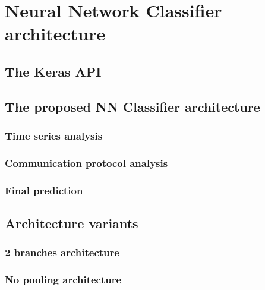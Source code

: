 \chapter{Neural Network Classifier architecture}

\lipsum[1]

\section{The Keras API}
\lipsum[1]

\section{The proposed NN Classifier architecture}
\lipsum[1]
\subsection{Time series analysis}
\lipsum[1]
\subsection{Communication protocol analysis}
\lipsum[1]
\subsection{Final prediction}
\lipsum[1]

\section{Architecture variants}
\lipsum[1]


\subsection{2 branches architecture}
\lipsum[1]
\subsection{No pooling architecture}
\lipsum[1]

